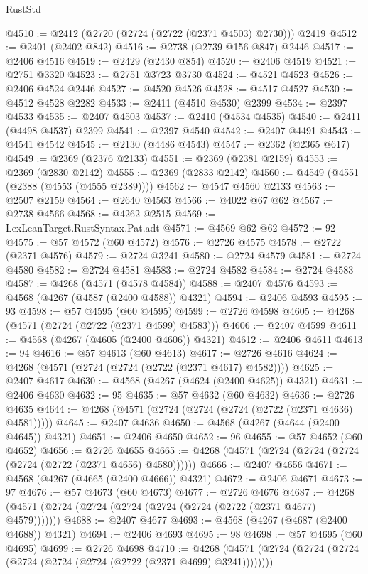 \begin{lexlean}{RustStd}
\begin{coremodule}
@4510 := @2412 (@2720 (@2724 (@2722 (@2371 @4503) @2730))) @2419
@4512 := @2401 (@2402 @842)
@4516 := @2738 (@2739 @156 @847) @2446
@4517 := @2406 @4516
@4519 := @2429 (@2430 @854)
@4520 := @2406 @4519
@4521 := @2751 @3320
@4523 := @2751 @3723 @3730
@4524 := @4521 @4523
@4526 := @2406 @4524 @2446
@4527 := @4520 @4526
@4528 := @4517 @4527
@4530 := @4512 @4528 @2282
@4533 := @2411 (@4510 @4530) @2399
@4534 := @2397 @4533
@4535 := @2407 @4503
@4537 := @2410 (@4534 @4535)
@4540 := @2411 (@4498 @4537) @2399
@4541 := @2397 @4540
@4542 := @2407 @4491
@4543 := @4541 @4542
@4545 := @2130 (@4486 @4543)
@4547 := @2362 (@2365 @617)
@4549 := @2369 (@2376 @2133)
@4551 := @2369 (@2381 @2159)
@4553 := @2369 (@2830 @2142)
@4555 := @2369 (@2833 @2142)
@4560 := @4549 (@4551 (@2388 (@4553 (@4555 @2389))))
@4562 := @4547 @4560 @2133
@4563 := @2507 @2159
@4564 := @2640 @4563
@4566 := @4022 @67 @62
@4567 := @2738 @4566
@4568 := @4262 @2515
@4569 := LexLeanTarget.RustSyntax.Pat.adt
@4571 := @4569 @62 @62
@4572 := 92
@4575 := @57 @4572 (@60 @4572)
@4576 := @2726 @4575
@4578 := @2722 (@2371 @4576)
@4579 := @2724 @3241
@4580 := @2724 @4579
@4581 := @2724 @4580
@4582 := @2724 @4581
@4583 := @2724 @4582
@4584 := @2724 @4583
@4587 := @4268 (@4571 (@4578 @4584))
@4588 := @2407 @4576
@4593 := @4568 (@4267 (@4587 (@2400 @4588)) @4321)
@4594 := @2406 @4593
@4595 := 93
@4598 := @57 @4595 (@60 @4595)
@4599 := @2726 @4598
@4605 := @4268 (@4571 (@2724 (@2722 (@2371 @4599) @4583)))
@4606 := @2407 @4599
@4611 := @4568 (@4267 (@4605 (@2400 @4606)) @4321)
@4612 := @2406 @4611
@4613 := 94
@4616 := @57 @4613 (@60 @4613)
@4617 := @2726 @4616
@4624 := @4268 (@4571 (@2724 (@2724 (@2722 (@2371 @4617) @4582))))
@4625 := @2407 @4617
@4630 := @4568 (@4267 (@4624 (@2400 @4625)) @4321)
@4631 := @2406 @4630
@4632 := 95
@4635 := @57 @4632 (@60 @4632)
@4636 := @2726 @4635
@4644 := @4268 (@4571 (@2724 (@2724 (@2724 (@2722 (@2371 @4636) @4581)))))
@4645 := @2407 @4636
@4650 := @4568 (@4267 (@4644 (@2400 @4645)) @4321)
@4651 := @2406 @4650
@4652 := 96
@4655 := @57 @4652 (@60 @4652)
@4656 := @2726 @4655
@4665 := @4268 (@4571 (@2724 (@2724 (@2724 (@2724 (@2722 (@2371 @4656) @4580))))))
@4666 := @2407 @4656
@4671 := @4568 (@4267 (@4665 (@2400 @4666)) @4321)
@4672 := @2406 @4671
@4673 := 97
@4676 := @57 @4673 (@60 @4673)
@4677 := @2726 @4676
@4687 := @4268 (@4571 (@2724 (@2724 (@2724 (@2724 (@2724 (@2722 (@2371 @4677) @4579)))))))
@4688 := @2407 @4677
@4693 := @4568 (@4267 (@4687 (@2400 @4688)) @4321)
@4694 := @2406 @4693
@4695 := 98
@4698 := @57 @4695 (@60 @4695)
@4699 := @2726 @4698
@4710 := @4268 (@4571 (@2724 (@2724 (@2724 (@2724 (@2724 (@2724 (@2722 (@2371 @4699) @3241))))))))

\end{coremodule}
\end{lexlean}
